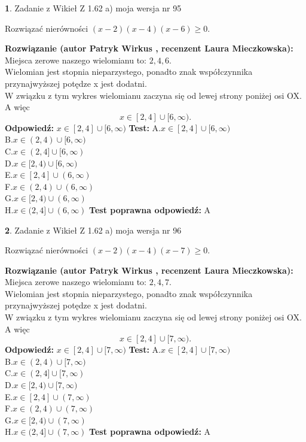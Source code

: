 \documentclass[12pt, a4paper]{article}
\theoremstyle{definition} %
\newtheorem{zad}{}
\newcommand{\zadStart}[1]{\begin{zad}#1\newline}
\newcommand{\zadStop}{\end{zad}}
\newcommand{\rozwStart}[2]{\noindent \textbf{Rozwiązanie (autor #1 , recenzent #2): }\newline}
\newcommand{\rozwStop}{\newline}
\newcommand{\odpStart}{\noindent \textbf{Odpowiedź:}\newline}
\newcommand{\odpStop}{\newline}
\newcommand{\testStart}{\noindent \textbf{Test:}\newline}
\newcommand{\testStop}{\newline}
\newcommand{\kluczStart}{\noindent \textbf{Test poprawna odpowiedź:}\newline}
\newcommand{\kluczStop}{\newline}
\begin{document}
\zadStart{Zadanie z Wikieł Z 1.62 a) moja wersja nr 95}

Rozwiązać nierówności $(x-2)(x-4)(x-6)\ge0$.
\zadStop
\rozwStart{Patryk Wirkus}{Laura Mieczkowska}
Miejsca zerowe naszego wielomianu to: $2, 4, 6$.\\
Wielomian jest stopnia nieparzystego, ponadto znak współczynnika przy\linebreak najwyższej potędze x jest dodatni.\\ W związku z tym wykres wielomianu zaczyna się od lewej strony poniżej osi OX. A więc $$x \in [2,4] \cup [6,\infty).$$
\rozwStop
\odpStart
$x \in [2,4] \cup [6,\infty)$
\odpStop
\testStart
A.$x \in [2,4] \cup [6,\infty)$\\
B.$x \in (2,4) \cup [6,\infty)$\\
C.$x \in (2,4] \cup [6,\infty)$\\
D.$x \in [2,4) \cup [6,\infty)$\\
E.$x \in [2,4] \cup (6,\infty)$\\
F.$x \in (2,4) \cup (6,\infty)$\\
G.$x \in [2,4) \cup (6,\infty)$\\
H.$x \in (2,4] \cup (6,\infty)$
\testStop
\kluczStart
A
\kluczStop



\zadStart{Zadanie z Wikieł Z 1.62 a) moja wersja nr 96}

Rozwiązać nierówności $(x-2)(x-4)(x-7)\ge0$.
\zadStop
\rozwStart{Patryk Wirkus}{Laura Mieczkowska}
Miejsca zerowe naszego wielomianu to: $2, 4, 7$.\\
Wielomian jest stopnia nieparzystego, ponadto znak współczynnika przy\linebreak najwyższej potędze x jest dodatni.\\ W związku z tym wykres wielomianu zaczyna się od lewej strony poniżej osi OX. A więc $$x \in [2,4] \cup [7,\infty).$$
\rozwStop
\odpStart
$x \in [2,4] \cup [7,\infty)$
\odpStop
\testStart
A.$x \in [2,4] \cup [7,\infty)$\\
B.$x \in (2,4) \cup [7,\infty)$\\
C.$x \in (2,4] \cup [7,\infty)$\\
D.$x \in [2,4) \cup [7,\infty)$\\
E.$x \in [2,4] \cup (7,\infty)$\\
F.$x \in (2,4) \cup (7,\infty)$\\
G.$x \in [2,4) \cup (7,\infty)$\\
H.$x \in (2,4] \cup (7,\infty)$
\testStop
\kluczStart
A
\kluczStop
\end{document}
